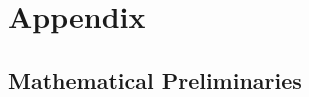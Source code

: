 \documentclass{book}
\begin{document}

% 
%
% 
%
 

%
%  

\part{Appendix}

\appendix

\chapter{Mathematical Preliminaries}\label{sec:math}



\tocentryBib


%
%
%
\end{document}

